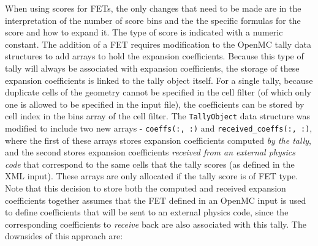 \documentclass[10pt]{article}
\numberwithin{equation}{section} %
\begin{document}
When using scores for FETs, the only changes that need to be made are in the interpretation of the number of score bins and the the specific formulas for the score and how to expand it. The type of score is indicated with a numeric constant. The addition of a FET requires modification to the OpenMC tally data structures to add arrays to hold the expansion coefficients. Because this type of tally will always be associated with expansion coefficients, the storage of these expansion coefficients is linked to the tally object itself. For a single tally, because duplicate cells of the geometry cannot be specified in the cell filter (of which only one is allowed to be specified in the input file), the coefficients can be stored by cell index in the bins array of the cell filter. The {\tt TallyObject} data structure was modified to include two new arrays - {\tt coeffs(:, :)} and {\tt received\_coeffs(:, :)}, where the first of these arrays stores expansion coefficients computed {\it by the tally}, and the second stores expansion coefficients {\it received from an external physics code} that correspond to the same cells that the tally scores (as defined in the XML input). These arrays are only allocated if the tally score is of FET type. Note that this decision to store both the computed and received expansion coefficients together assumes that the FET defined in an OpenMC input is used to define coefficients that will be sent to an external physics code, since the corresponding coefficients to {\it receive} back are also associated with this tally. The downsides of this approach are:
\end{document}
